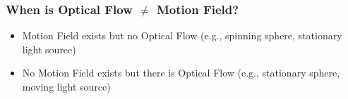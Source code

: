 \begin{frame}
  \frametitle{When is Optical Flow $\neq$ Motion Field?}


  \begin{figure}[!h]
    \hspace*{2em}
  \end{figure}

\begin{itemize}
  \item Motion Field exists but no Optical Flow (e.g., spinning sphere, stationary light source)
  \item No Motion Field exists but there is Optical Flow (e.g., stationary sphere, moving light source)
\end{itemize}

\end{frame}



